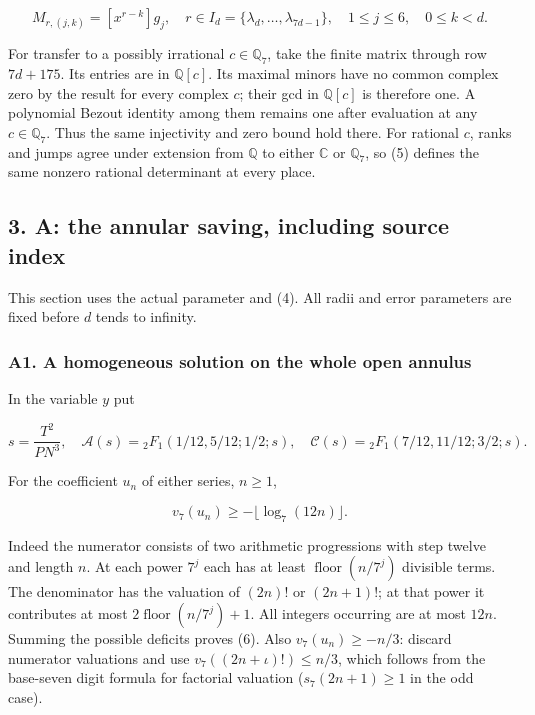 \documentclass[11pt,a4paper]{article}
\begin{document}
\[
M_{r,(j,k)}=[x^{r-k}]g_j,
\quad r\in I_d=\{\lambda_d,\ldots,\lambda_{7d-1}\},
\quad1\le j\le6,\quad0\le k<d.\tag{5}
\]

For transfer to a possibly irrational \(c∈\mathbb{Q}_{7}\), take the finite matrix through row \(7d+175\). Its entries are in \(\mathbb{Q}[c]\). Its maximal minors have no common complex zero by the result for every complex \(c\); their gcd in \(\mathbb{Q}[c]\) is therefore one. A polynomial Bezout identity among them remains one after evaluation at any \(c∈\mathbb{Q}_{7}\). Thus the same injectivity and zero bound hold there. For rational \(c\), ranks and jumps agree under extension from \(\mathbb{Q}\) to either \(\mathbb{C}\) or \(\mathbb{Q}_{7}\), so (5) defines the same nonzero rational determinant at every place.

\hypertarget{a-the-annular-saving-including-source-index}{%
\subsection{3. A: the annular saving, including source index}\label{a-the-annular-saving-including-source-index}}

This section uses the actual parameter and (4). All radii and error parameters are fixed before \(d\) tends to infinity.

\hypertarget{a1.-a-homogeneous-solution-on-the-whole-open-annulus}{%
\subsubsection{A1. A homogeneous solution on the whole open annulus}\label{a1.-a-homogeneous-solution-on-the-whole-open-annulus}}

In the variable \(y\) put

\[
s=\frac{T^2}{PN^3},\quad
\mathcal A(s)={}_2F_1(1/12,5/12;1/2;s),\quad
\mathcal C(s)={}_2F_1(7/12,11/12;3/2;s).
\]

For the coefficient \(u_n\) of either series, \(n≥1\),

\[
v_7(u_n)\ge-\lfloor\log_7(12n)\rfloor.\tag{6}
\]

Indeed the numerator consists of two arithmetic progressions with step twelve and length \(n\). At each power \(7^j\) each has at least \(\operatorname{floor}(n/7^j)\) divisible terms. The denominator has the valuation of \((2n)!\) or \((2n+1)!\); at that power it contributes at most \(2 \operatorname{floor}(n/7^j)+1\). All integers occurring are at most \(12n\). Summing the possible deficits proves (6). Also \(v_{7}(u_n)≥-n/3\): discard numerator valuations and use \(v_{7}((2n+ι)!)≤n/3\), which follows from the base-seven digit formula for factorial valuation (\(s_{7}(2n+1)≥1\) in the odd case).
\end{document}
